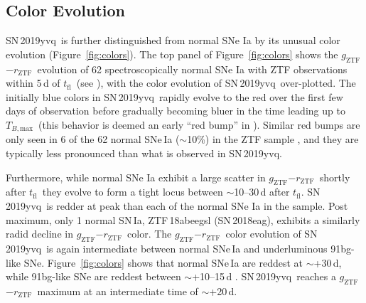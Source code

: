 \documentclass[twocolumn]{aastex63}
\newcommand{\rztf}{$r_\mathrm{ZTF}$}
\newcommand{\gztf}{$g_\mathrm{ZTF}$}
\newcommand{\tfl}{$t_\mathrm{fl}$}
\newcommand{\tbmax}{$T_{B,\mathrm{max}}$}
\newcommand{\sn}{SN\,2019yvq}
\begin{document}
\subsection{Color Evolution}

\sn\ is further distinguished from normal SNe Ia by its unusual color
evolution (Figure~\ref{fig:colors}). The top panel of Figure~\ref{fig:colors}
shows the \gztf$ - $\rztf\ evolution of 62 spectroscopically normal SNe Ia
with ZTF observations within 5\,d of \tfl\ (see \citealt{Bulla20}), with the
color evolution of \sn\ over-plotted. The initially blue colors in \sn\
rapidly evolve to the red over the first few days of observation before
gradually becoming bluer in the time leading up to \tbmax\ (this behavior is
deemed an early ``red bump'' in \citealt{Bulla20}). Similar red bumps are only
seen in 6 of the 62 normal SNe\,Ia ($\sim$10\%) in the ZTF sample
\citep{Bulla20}, and they are typically less pronounced than what is observed
in \sn.

Furthermore, while normal SNe Ia exhibit a large scatter in
\gztf$ - $\rztf\ shortly after \tfl\ they evolve to form a tight locus between
$\sim$10--30\,d after \tfl. \sn\ is redder at peak than each of the normal SNe
Ia in the \citet{Bulla20} sample. Post maximum, only 1 normal SN\,Ia,
ZTF\,18abeegsl (SN\,2018eag), exhibits a similarly radid decline in \gztf$ -
$\rztf\ color. The \gztf$ - $\rztf\ color evolution of \sn\ is again
intermediate between normal SNe\,Ia and underluminous 91bg-like SNe.
Figure~\ref{fig:colors} shows that normal SNe\,Ia are reddest at $\sim$+30\,d,
while 91bg-like SNe are reddest between $\sim$+10--15\,d \citep{Burns14}. \sn\
reaches a \gztf$-$\rztf\ maximum at an intermediate time of $\sim$+20\,d.
\end{document}
